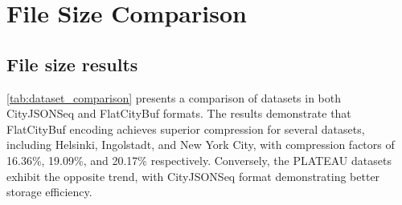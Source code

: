 \section{File Size Comparison}
\label{result:file_size_comparison}

\subsection{File size results}
\label{result:overview:filesize_comparison}

\autoref{tab:dataset_comparison} presents a comparison of datasets in both CityJSONSeq and FlatCityBuf formats. The results demonstrate that FlatCityBuf encoding achieves superior compression for several datasets, including Helsinki, Ingolstadt, and New York City, with compression factors of 16.36\%, 19.09\%, and 20.17\% respectively. Conversely, the PLATEAU datasets exhibit the opposite trend, with CityJSONSeq format demonstrating better storage efficiency.
